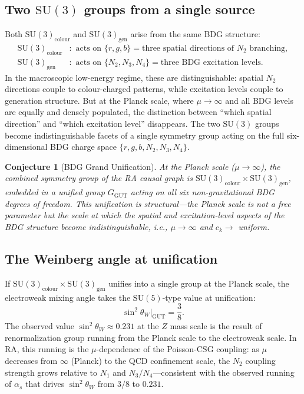 \documentclass[11pt]{article}
\newtheorem{conjecture}{Conjecture}
\begin{document}
\subsection{Two $\mathrm{SU}(3)$ groups from a single source}

Both $\mathrm{SU}(3)_{\mathrm{colour}}$ and $\mathrm{SU}(3)_{\mathrm{gen}}$ arise from the same BDG structure:
\begin{align}
\mathrm{SU}(3)_{\mathrm{colour}} &: \text{ acts on } \{r,g,b\}=\text{three spatial directions of }N_2\text{ branching},\\
\mathrm{SU}(3)_{\mathrm{gen}} &: \text{ acts on } \{N_2,N_3,N_4\}=\text{three BDG excitation levels}.
\end{align}
In the macroscopic low-energy regime, these are distinguishable: spatial $N_2$ directions couple to colour-charged patterns, while excitation levels couple to generation structure. But at the Planck scale, where $\mu\to\infty$ and all BDG levels are equally and densely populated, the distinction between ``which spatial direction'' and ``which excitation level'' disappears. The two $\mathrm{SU}(3)$ groups become indistinguishable facets of a single symmetry group acting on the full six-dimensional BDG charge space $\{r,g,b,N_2,N_3,N_4\}$.

\begin{conjecture}[BDG Grand Unification]
At the Planck scale ($\mu\to\infty$), the combined symmetry group of the RA causal graph is $\mathrm{SU}(3)_{\mathrm{colour}}\times\mathrm{SU}(3)_{\mathrm{gen}}$, embedded in a unified group $G_{\mathrm{GUT}}$ acting on all six non-gravitational BDG degrees of freedom. This unification is structural---the Planck scale is not a free parameter but the scale at which the spatial and excitation-level aspects of the BDG structure become indistinguishable, i.e., $\mu\to\infty$ and $c_k\to$ uniform.
\end{conjecture}

\subsection{The Weinberg angle at unification}

If $\mathrm{SU}(3)_{\mathrm{colour}}\times\mathrm{SU}(3)_{\mathrm{gen}}$ unifies into a single group at the Planck scale, the electroweak mixing angle takes the $\mathrm{SU}(5)$-type value at unification:
\begin{equation}
\sin^2\theta_W\Big|_{\mathrm{GUT}} = \frac{3}{8}.
\end{equation}
The observed value $\sin^2\theta_W\approx 0.231$ at the $Z$ mass scale is the result of renormalization group running from the Planck scale to the electroweak scale. In RA, this running is the $\mu$-dependence of the Poisson-CSG coupling: as $\mu$ decreases from $\infty$ (Planck) to the QCD confinement scale, the $N_2$ coupling strength grows relative to $N_1$ and $N_3/N_4$---consistent with the observed running of $\alpha_s$ that drives $\sin^2\theta_W$ from $3/8$ to $0.231$.
\end{document}
